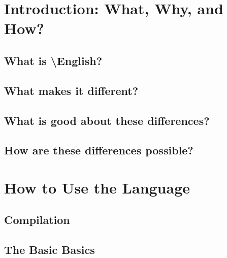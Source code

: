 \documentclass{article}
\newcommand{\name}{\textbackslash{}English}				%
\let\oldsection\section
\renewcommand{\section}[2]{\oldsection{#1}\label{#2}}
\begin{document}
\setlength\parindent{1cm}								%

\tableofcontents
\newpage

\obeylines												%

\section{Introduction: What, Why, and How?}{intro}
\subsection{What is \name{}?}

\subsection{What makes it different?}

\subsection{What is good about these differences?}

\subsection{How are these differences possible?}

\section{How to Use the Language}{how}
\subsection{Compilation}

\subsection{The Basic Basics}
\end{document}

